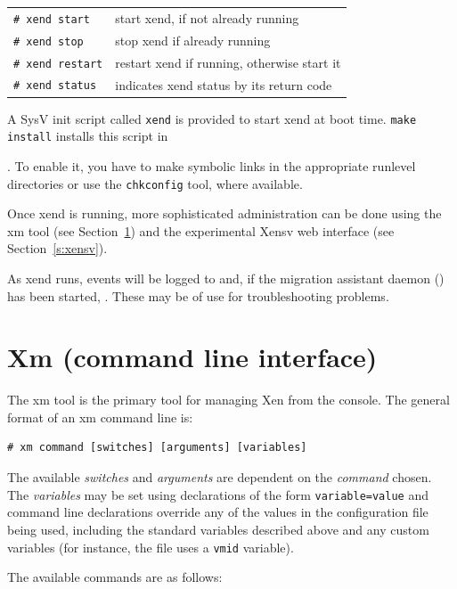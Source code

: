 \documentclass[11pt,twoside,final,openright]{report}
\def\xend{{xend}\xspace}
\begin{document}
\begin{tabular}{ll}
\verb!# xend start! & start \xend, if not already running \\
\verb!# xend stop!  & stop \xend if already running       \\
\verb!# xend restart! & restart \xend if running, otherwise start it \\
\verb!# xend status! & indicates \xend status by its return code
\end{tabular}

A SysV init script called {\tt xend} is provided to start \xend at boot
time.  {\tt make install} installs this script in {.
To enable it, you have to make symbolic links in the appropriate
runlevel directories or use the {\tt chkconfig} tool, where available.

Once \xend is running, more sophisticated administration can be done
using the xm tool (see Section~\ref{s:xm}) and the experimental
Xensv web interface (see Section~\ref{s:xensv}).

As \xend runs, events will be logged to  and, 
if the migration assistant daemon () has been started, 
. These may be of use for troubleshooting
problems.

\section{Xm (command line interface)}
\label{s:xm}

The xm tool is the primary tool for managing Xen from the console.
The general format of an xm command line is:

\begin{verbatim}
# xm command [switches] [arguments] [variables]
\end{verbatim}

The available {\em switches} and {\em arguments} are dependent on the
{\em command} chosen.  The {\em variables} may be set using
declarations of the form {\tt variable=value} and command line
declarations override any of the values in the configuration file
being used, including the standard variables described above and any
custom variables (for instance, the  file uses a
{\tt vmid} variable).

The available commands are as follows:

}
\end{document}
